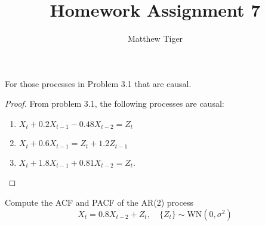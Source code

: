 \documentclass[12pt]{article}
\title{Homework Assignment 7}
\author{Matthew Tiger}
\theoremstyle{definition}
\newenvironment{custompbm}[1]
  {\renewcommand\theproblem{#1}\problem}
  {\endproblem}
\begin{document}
\maketitle



\begin{custompbm}{3.2}
  For those processes in Problem 3.1 that are causal.
\end{custompbm}

\begin{proof}
  From problem 3.1, the following processes are causal:
  \begin{enumerate}
    \item $X_t + 0.2X_{t-1} - 0.48X_{t-2} = Z_t$
    \item $X_t + 0.6X_{t-1} = Z_t + 1.2Z_{t-1}$
    \item $X_t + 1.8X_{t-1} + 0.81X_{t-2} = Z_t$.
  \end{enumerate}
\end{proof}


\begin{custompbm}{3.4}
  Compute the ACF and PACF of the AR(2) process
  \[
    X_t = 0.8X_{t-2} + Z_t, \quad \{Z_t\} \sim \text{WN}(0, \sigma ^2)
  \]
\end{custompbm}
\end{document}
